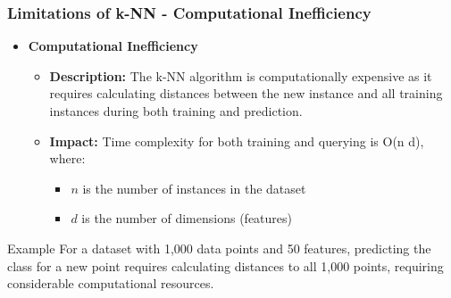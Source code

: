 \documentclass[aspectratio=169]{beamer}
\begin{document}
\begin{frame}[fragile]
    \frametitle{Limitations of k-NN - Computational Inefficiency}
    \begin{itemize}
        \item \textbf{Computational Inefficiency}
        \begin{itemize}
            \item \textbf{Description:} The k-NN algorithm is computationally expensive as it requires calculating distances between the new instance and all training instances during both training and prediction.
            \item \textbf{Impact:} Time complexity for both training and querying is O(n \cdot d), where:
            \begin{itemize}
                \item $n$ is the number of instances in the dataset
                \item $d$ is the number of dimensions (features)
            \end{itemize}
        \end{itemize}
    \end{itemize}
    \begin{block}{Example}
        For a dataset with 1,000 data points and 50 features, predicting the class for a new point requires calculating distances to all 1,000 points, requiring considerable computational resources.
    \end{block}
\end{frame}
\end{document}
